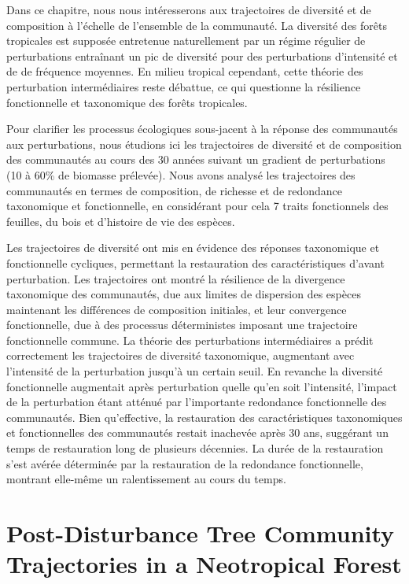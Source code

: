 \documentclass[
  11pt,
  french,
  A4paper,
  extrafontsizes,onecolumn,openright
  ]{memoir}
\begin{document}
Dans ce chapitre, nous nous intéresserons aux trajectoires de diversité
et de composition à l'échelle de l'ensemble de la communauté. La
diversité des forêts tropicales est supposée entretenue naturellement
par un régime régulier de perturbations entraînant un pic de diversité
pour des perturbations d'intensité et de de fréquence moyennes. En
milieu tropical cependant, cette théorie des perturbation intermédiaires
reste débattue, ce qui questionne la résilience fonctionnelle et
taxonomique des forêts tropicales.

Pour clarifier les processus écologiques sous-jacent à la réponse des
communautés aux perturbations, nous étudions ici les trajectoires de
diversité et de composition des communautés au cours des 30 années
suivant un gradient de perturbations (10 à 60\% de biomasse prélevée).
Nous avons analysé les trajectoires des communautés en termes de
composition, de richesse et de redondance taxonomique et fonctionnelle,
en considérant pour cela 7 traits fonctionnels des feuilles, du bois et
d'histoire de vie des espèces.

Les trajectoires de diversité ont mis en évidence des réponses
taxonomique et fonctionnelle cycliques, permettant la restauration des
caractéristiques d'avant perturbation. Les trajectoires ont montré la
résilience de la divergence taxonomique des communautés, due aux limites
de dispersion des espèces maintenant les différences de composition
initiales, et leur convergence fonctionnelle, due à des processus
déterministes imposant une trajectoire fonctionnelle commune. La théorie
des perturbations intermédiaires a prédit correctement les trajectoires
de diversité taxonomique, augmentant avec l'intensité de la perturbation
jusqu'à un certain seuil. En revanche la diversité fonctionnelle
augmentait après perturbation quelle qu'en soit l'intensité, l'impact de
la perturbation étant atténué par l'importante redondance fonctionnelle
des communautés. Bien qu'effective, la restauration des caractéristiques
taxonomiques et fonctionnelles des communautés restait inachevée après
30 ans, suggérant un temps de restauration long de plusieurs décennies.
La durée de la restauration s'est avérée déterminée par la restauration
de la redondance fonctionnelle, montrant elle-même un ralentissement au
cours du temps.

\newpage

\section*{Post-Disturbance Tree Community Trajectories in a Neotropical
Forest}\label{post-disturbance-tree-community-trajectories-in-a-neotropical-forest}
\end{document}
